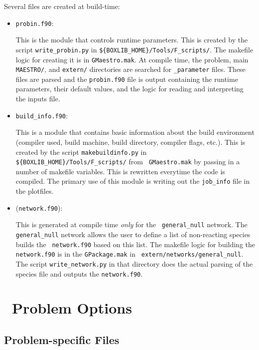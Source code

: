 Several files are created at build-time:
\begin{itemize}
\item {\tt probin.f90}:

  This is the module that controls runtime parameters.  This is
  created by the script
  {\tt write\_probin.py} in {\tt \$\{BOXLIB\_HOME\}/Tools/F\_scripts/}.  The
  makefile logic for creating it is in {\tt GMaestro.mak}.  At compile
  time, the problem, main {\tt MAESTRO/}, and {\tt extern/}
  directories are searched for {\tt \_parameter} files.  These files
  are parsed and the {\tt probin.f90} file is output containing the 
  runtime parameters, their default values, and the logic for reading
  and interpreting the inputs file.

\item {\tt build\_info.f90}:

  This is a module that contains basic information about the build
  environment (compiler used, build machine, build directory, compiler
  flags, etc.).  This is created by the script {\tt makebuildinfo.py}
  in {\tt \$\{BOXLIB\_HOME\}/Tools/F\_scripts/} from {\tt
  GMaestro.mak} by passing in a number of makefile variables.  This is
  rewritten everytime the code is compiled.  The primary use of this
  module is writing out the {\tt job\_info} file in the plotfiles.

\item ({\tt network.f90}):

  This is generated at compile time {\em only} for the {\tt
  general\_null} network.  The {\tt general\_null} network allows the
  user to define a list of non-reacting species builds the {\tt
  network.f90} based on this list.  The makefile logic for building
  the {\tt network.f90} is in the {\tt GPackage.mak} in {\tt
  extern/networks/general\_null}.  The script {\tt write\_network.py}
  in that directory does the actual parsing of the species file and
  outputs the {\tt network.f90}.


\end{itemize}



\section{\maestro\ Problem Options}

\subsection{Problem-specific Files}
\label{sec:make:otherfiles}

